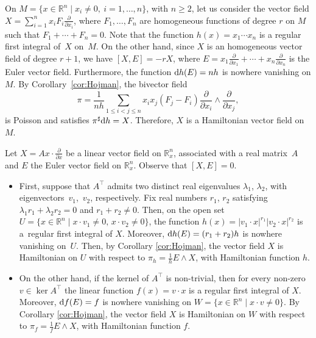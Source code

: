 \documentclass[10pt,a4paper]{amsart}
\newcommand{\R}[1]{\mathbb{R}^{#1}}
\newcommand{\dd}{{\rm d}}
\numberwithin{equation}{section}
\begin{document}
\begin{Example}
On $M=\{ x \in \R{n} \mid x_{i} \neq 0,\ i= 1,\dots,n\}$, with $n\geq2$, let us consider the vector field $X = \sum_{i=1}^{n} x_{i}F_{i}\frac{\partial}{\partial x_{i}}$, where $F_{1},\dots,F_{n}$ are homogeneous functions of degree $r$ on $M$ such that $F_{1} + \cdots + F_{n} = 0$. Note that the function $h(x)=x_{1} \cdots x_{n}$ is a regular first integral of~$X$ on~$M$. On the other hand, since $X$ is an homogeneous vector field of degree $r+1$, we have $[X,E] = -rX$, where $E = x_{1}\frac{\partial}{\partial x_{1}} + \cdots + x_{n}\frac{\partial}{\partial x_{n}}$ is the Euler vector field. Furthermore, the function $\dd h(E) = nh$ is nowhere vanishing on $M$. By Corollary~\ref{cor:Hojman}, the bivector field
 \begin{equation*}
 \pi = \frac{1}{nh} \sum_{1 \leq i < j \leq n} x_i x_j (F_j - F_i) \frac{\partial}{\partial x_i} \wedge \frac{\partial}{\partial x_j},
 \end{equation*}
is Poisson and satisfies $\pi^{\sharp}\dd h = X$. Therefore, $X$ is a Hamiltonian vector field on~$M$.
\end{Example}

\begin{Example}
Let $X = Ax\cdot\frac{\partial}{\partial x}$ be a linear vector field on $\R{n}_{x}$, associated with a real mat\-rix~$A$ and $E$ the Euler vector field on $\R{n}_{x}$. Observe that $[X,E] = 0$.
\begin{itemize}\itemsep=0pt
\item First, suppose that $A^{\top}$ admits two distinct real eigenvalues $\lambda_{1}$, $\lambda_{2}$, with eigenvectors~$v_{1}$,~$v_{2}$, respectively. Fix real numbers $r_{1}$, $r_{2}$ satisfying $\lambda_{1}r_{1} + \lambda_{2}r_{2} = 0$ and $r_{1} + r_{2} \neq 0$. Then, on the open set $U = \{x\in\R{n} \mid x\cdot v_{1}\neq0, \, x\cdot v_{2}\neq 0\}$, the function $h(x) = |v_{1} \cdot x|^{r_{1}} |v_{2}\cdot x|^{r_{2}}$ is a~regular first integral of $X$. Moreover, $\dd h(E)= (r_{1} + r_{2}) h$ is nowhere vanishing on~$U$. Then, by Corollary \ref{cor:Hojman}, the vector field $X$ is Hamiltonian on $U$ with respect to $\pi_{h} = \frac{1}{h}E \wedge X$, with Hamiltonian function $h$.
\item On the other hand, if the kernel of $A^{\top}$ is non-trivial, then for every non-zero $v \in \ker{A^{\top}}$ the linear function $f(x) = v \cdot x$ is a regular first integral of $X$. Moreover, $\dd f(E)= f$ is nowhere vanishing on $W = \{x\in\R{n} \mid x\cdot v\neq0\}$. By Corollary \ref{cor:Hojman}, the vector field $X$ is Hamiltonian on $W$ with respect to $\pi_{f} = \frac{1}{f}E \wedge X$, with Hamiltonian function $f$.%
\end{itemize}
\end{Example}
\end{document}
